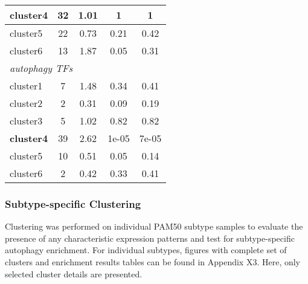 \begin{table}[!h]
\begin{tabular}{lcccc}
            \multicolumn{1}{l|}{cluster4} & \multicolumn{1}{c|}{32} & \multicolumn{1}{c|}{1.01} & \multicolumn{1}{c|}{1} & 1 \\ \hline
            \multicolumn{1}{l|}{cluster5} & \multicolumn{1}{c|}{22} & \multicolumn{1}{c|}{0.73} & \multicolumn{1}{c|}{0.21} & 0.42 \\ \hline
            \multicolumn{1}{l|}{cluster6} & \multicolumn{1}{c|}{13} & \multicolumn{1}{c|}{1.87} & \multicolumn{1}{c|}{0.05} & 0.31 \\ \hline
            \multicolumn{5}{l}{\textit{autophagy TFs}} \\ \hline
            \multicolumn{1}{l|}{cluster1} & \multicolumn{1}{c|}{7} & \multicolumn{1}{c|}{1.48} & \multicolumn{1}{c|}{0.34} & 0.41 \\ \hline
            \multicolumn{1}{l|}{cluster2} & \multicolumn{1}{c|}{2} & \multicolumn{1}{c|}{0.31} & \multicolumn{1}{c|}{0.09} & 0.19 \\ \hline
            \multicolumn{1}{l|}{cluster3} & \multicolumn{1}{c|}{5} & \multicolumn{1}{c|}{1.02} & \multicolumn{1}{c|}{0.82} & 0.82 \\ \hline
            \multicolumn{1}{l|}{\textbf{cluster4}} & \multicolumn{1}{c|}{39} & \multicolumn{1}{c|}{2.62} & \multicolumn{1}{c|}{1e-05} & 7e-05 \\ \hline
            \multicolumn{1}{l|}{cluster5} & \multicolumn{1}{c|}{10} & \multicolumn{1}{c|}{0.51} & \multicolumn{1}{c|}{0.05} & 0.14 \\ \hline
            \multicolumn{1}{l|}{cluster6} & \multicolumn{1}{c|}{2} & \multicolumn{1}{c|}{0.42} & \multicolumn{1}{c|}{0.33} & 0.41 \\ \hline
            \end{tabular}
            \end{table}
        
     
        \newpage
        \subsubsection{Subtype-specific Clustering}
        
        Clustering was performed on individual PAM50 subtype samples to evaluate the presence of any characteristic expression patterns and test for subtype-specific autophagy enrichment. 
        For individual subtypes, figures with complete set of clusters and enrichment results tables can be found in Appendix X3. Here, only selected cluster details are presented. 
        
